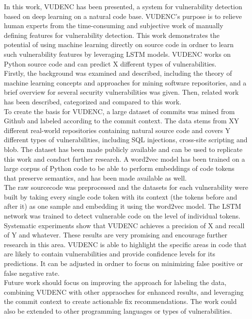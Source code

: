 \documentclass[
	a4paper,
	pagesize,
	pdftex,
	12pt,
	twoside, %
	BCOR=5mm, %
	ngerman,
	fleqn,
	final,
	]{scrartcl}
\begin{document}
In this work, VUDENC has been presented, a system for vulnerability detection based on deep learning on a natural code base. VUDENC's purpose is to relieve human experts from the time-consuming and subjective work of manually defining features for vulnerability detection. This work demonstrates the potential of using machine learning directly on source code in ordner to learn such vulnerability features by leveraging LSTM models. VUDENC works on Python source code and can predict X different types of vulnerabilities.\\
Firstly, the background was examined and described, including the theory of machine learning concepts and approaches for mining software repositories, and a brief overview for several security vulnerabilities was given. Then, related work has been described, categorized and compared to this work.\\
To create the basis for VUDENC, a large dataset of commits was mined from Github and labeled according to the commit context. The data stems from XY different real-world repositories containing natural source code and covers Y different types of vulnerabilities, including SQL injections, cross-site scripting and blob. The dataset has been made publicly available and can be used to replicate this work and conduct further research. A word2vec model has been trained on a large corpus of Python code to be able to perform embeddings of code tokens that preserve semantics, and has been made available as well.\\
The raw sourcecode was preprocessed and the datasets for each vulnerability were built by taking every single code token with its context (the tokens before and after it) as one sample and embedding it using the word2vec model. The LSTM network was trained to detect vulnerable code on the level of individual tokens.\\
Systematic experiments show that VUDENC achieves a precision of X and recall of Y and whatever.  These results are very promising and encourage further research in this area. VUDENC is able to highlight the specific areas in code that are likely to contain vulnerabilities and provide confidence levels for its predictions. It can be adjusted in ordner to focus on minimizing false positive or false negative rate. \\
Future work should focus on improving the approach for labeling the data, combining VUDENC with other appraoches for enhanced results, and leveraging the commit context to create actionable fix recommendations. The work could also be extended to other programming languages or types of vulnerabilities.
\end{document}
